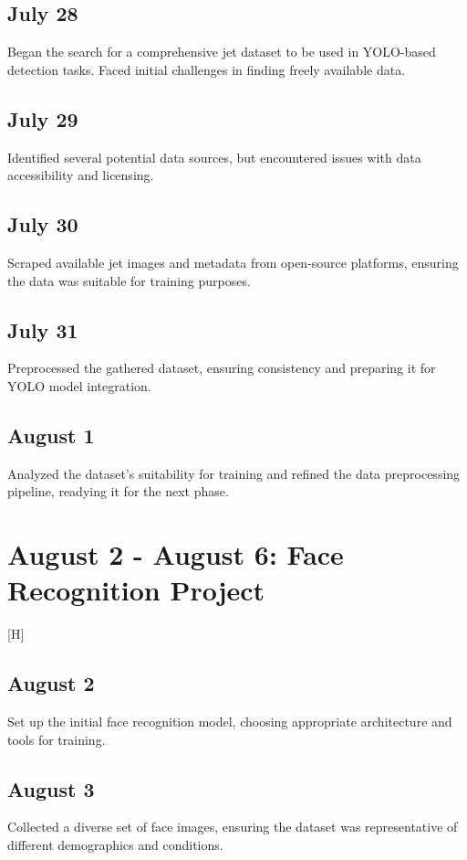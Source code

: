 \documentclass{report}
\begin{document}
\subsection*{July 28}
Began the search for a comprehensive jet dataset to be used in YOLO-based detection tasks. Faced initial challenges in finding freely available data.

\subsection*{July 29}
Identified several potential data sources, but encountered issues with data accessibility and licensing.

\subsection*{July 30}
Scraped available jet images and metadata from open-source platforms, ensuring the data was suitable for training purposes.

\subsection*{July 31}
Preprocessed the gathered dataset, ensuring consistency and preparing it for YOLO model integration.

\subsection*{August 1}
Analyzed the dataset’s suitability for training and refined the data preprocessing pipeline, readying it for the next phase.

\section{August 2 - August 6: Face Recognition Project}[H]

\subsection*{August 2}
Set up the initial face recognition model, choosing appropriate architecture and tools for training.

\subsection*{August 3}
Collected a diverse set of face images, ensuring the dataset was representative of different demographics and conditions.
\end{document}
